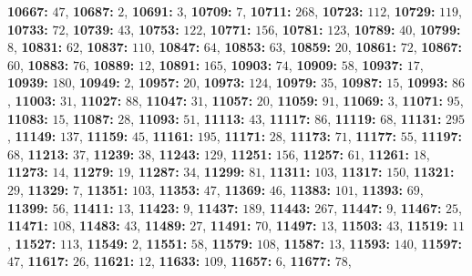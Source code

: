 \textsf{\bfseries 10667:} $47$, \textsf{\bfseries 10687:} $2$, \textsf{\bfseries 10691:} $3$, \textsf{\bfseries 10709:} $7$, \textsf{\bfseries 10711:} $268$, \textsf{\bfseries 10723:} $112$, \textsf{\bfseries 10729:} $119$, \textsf{\bfseries 10733:} $72$, \textsf{\bfseries 10739:} $43$, \textsf{\bfseries 10753:} $122$, \textsf{\bfseries 10771:} $156$, \textsf{\bfseries 10781:} $123$, \textsf{\bfseries 10789:} $40$, \textsf{\bfseries 10799:} $8$, \textsf{\bfseries 10831:} $62$, \textsf{\bfseries 10837:} $110$, \textsf{\bfseries 10847:} $64$, \textsf{\bfseries 10853:} $63$, \textsf{\bfseries 10859:} $20$, \textsf{\bfseries 10861:} $72$, \textsf{\bfseries 10867:} $60$, \textsf{\bfseries 10883:} $76$, \textsf{\bfseries 10889:} $12$, \textsf{\bfseries 10891:} $165$, \textsf{\bfseries 10903:} $74$, \textsf{\bfseries 10909:} $58$, \textsf{\bfseries 10937:} $17$, \textsf{\bfseries 10939:} $180$, \textsf{\bfseries 10949:} $2$, \textsf{\bfseries 10957:} $20$, \textsf{\bfseries 10973:} $124$, \textsf{\bfseries 10979:} $35$, \textsf{\bfseries 10987:} $15$, \textsf{\bfseries 10993:} $86$, \textsf{\bfseries 11003:} $31$, \textsf{\bfseries 11027:} $88$, \textsf{\bfseries 11047:} $31$, \textsf{\bfseries 11057:} $20$, \textsf{\bfseries 11059:} $91$, \textsf{\bfseries 11069:} $3$, \textsf{\bfseries 11071:} $95$, \textsf{\bfseries 11083:} $15$, \textsf{\bfseries 11087:} $28$, \textsf{\bfseries 11093:} $51$, \textsf{\bfseries 11113:} $43$, \textsf{\bfseries 11117:} $86$, \textsf{\bfseries 11119:} $68$, \textsf{\bfseries 11131:} $295$, \textsf{\bfseries 11149:} $137$, \textsf{\bfseries 11159:} $45$, \textsf{\bfseries 11161:} $195$, \textsf{\bfseries 11171:} $28$, \textsf{\bfseries 11173:} $71$, \textsf{\bfseries 11177:} $55$, \textsf{\bfseries 11197:} $68$, \textsf{\bfseries 11213:} $37$, \textsf{\bfseries 11239:} $38$, \textsf{\bfseries 11243:} $129$, \textsf{\bfseries 11251:} $156$, \textsf{\bfseries 11257:} $61$, \textsf{\bfseries 11261:} $18$, \textsf{\bfseries 11273:} $14$, \textsf{\bfseries 11279:} $19$, \textsf{\bfseries 11287:} $34$, \textsf{\bfseries 11299:} $81$, \textsf{\bfseries 11311:} $103$, \textsf{\bfseries 11317:} $150$, \textsf{\bfseries 11321:} $29$, \textsf{\bfseries 11329:} $7$, \textsf{\bfseries 11351:} $103$, \textsf{\bfseries 11353:} $47$, \textsf{\bfseries 11369:} $46$, \textsf{\bfseries 11383:} $101$, \textsf{\bfseries 11393:} $69$, \textsf{\bfseries 11399:} $56$, \textsf{\bfseries 11411:} $13$, \textsf{\bfseries 11423:} $9$, \textsf{\bfseries 11437:} $189$, \textsf{\bfseries 11443:} $267$, \textsf{\bfseries 11447:} $9$, \textsf{\bfseries 11467:} $25$, \textsf{\bfseries 11471:} $108$, \textsf{\bfseries 11483:} $43$, \textsf{\bfseries 11489:} $27$, \textsf{\bfseries 11491:} $70$, \textsf{\bfseries 11497:} $13$, \textsf{\bfseries 11503:} $43$, \textsf{\bfseries 11519:} $11$, \textsf{\bfseries 11527:} $113$, \textsf{\bfseries 11549:} $2$, \textsf{\bfseries 11551:} $58$, \textsf{\bfseries 11579:} $108$, \textsf{\bfseries 11587:} $13$, \textsf{\bfseries 11593:} $140$, \textsf{\bfseries 11597:} $47$, \textsf{\bfseries 11617:} $26$, \textsf{\bfseries 11621:} $12$, \textsf{\bfseries 11633:} $109$, \textsf{\bfseries 11657:} $6$, \textsf{\bfseries 11677:} $78$, 

